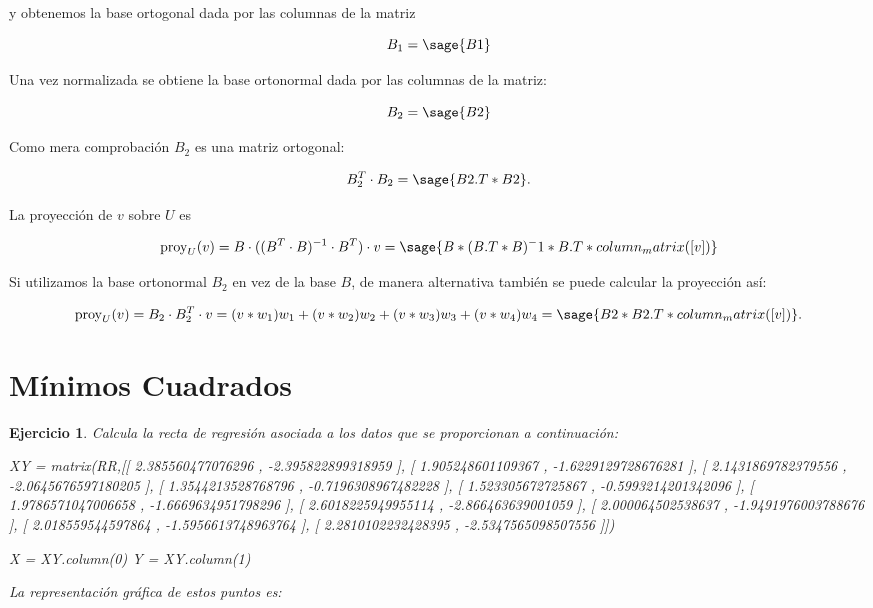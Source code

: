 \documentclass{amsart}
\newtheorem{ejer}{Ejercicio}
\begin{document}
y obtenemos la base ortogonal dada por las columnas de la matriz

$$ B_1 = \sage{B1} $$
	
Una vez normalizada se obtiene la base ortonormal dada por las columnas de la matriz:

$$ B_2 = \sage{B2} $$

Como mera comprobación $B_2$ es una matriz ortogonal:

$$ B_2^T\cdot B_2 = \sage{B2.T*B2}.$$

La proyección de $v$ sobre $U$ es

$$ {\rm proy}_U(v) = B\cdot ((B^T\cdot B)^{-1}\cdot B^T)\cdot v = \sage{B*(B.T*B)^-1*B.T*column_matrix([v])}$$

Si utilizamos la base ortonormal $B_2$ en vez de la base $B$, de manera alternativa también se puede calcular la proyección así:

$$
	{\rm proy}_U(v) = B_2\cdot B_2^T\cdot v = (v*w_1)w_1+(v*w_2)w_2+(v*w_3)w_3+(v*w_4)w_4  = \sage{B2*B2.T*column_matrix([v])}.
$$


\section{Mínimos Cuadrados}

\begin{ejer} 
Calcula la recta de regresión asociada a los datos que se proporcionan a continuación:
\begin{sageblock}
XY = matrix(RR,[[ 2.385560477076296 ,  -2.395822899318959 ],
                [ 1.905248601109367 ,  -1.6229129728676281 ],
                [ 2.1431869782379556 ,  -2.0645676597180205 ],
                [ 1.3544213528768796 ,  -0.7196308967482228 ],
                [ 1.523305672725867 ,  -0.5993214201342096 ],
                [ 1.9786571047006658 ,  -1.6669634951798296 ],
                [ 2.6018225949955114 ,  -2.866463639001059 ],
                [ 2.000064502538637 ,  -1.9491976003788676 ],
                [ 2.018559544597864 ,  -1.5956613748963764 ],
                [ 2.2810102232428395 ,  -2.5347565098507556 ]])

X = XY.column(0)
Y = XY.column(1)
\end{sageblock}

La representación gráfica de estos puntos es:

\begin{sagesub}
\begin{center}
\end{center}
\end{sagesub}


\end{ejer} 
\end{document}
